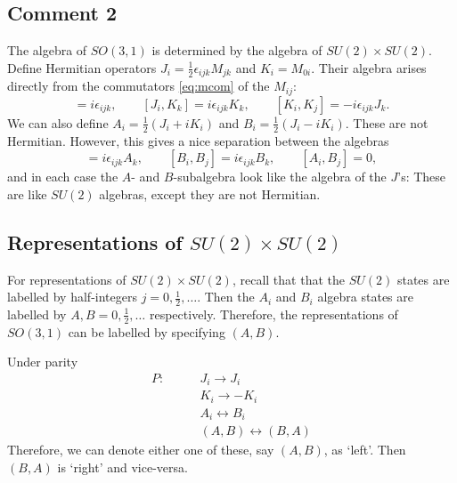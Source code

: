 
\subsection*{Comment 2}%


The algebra of $SO(3, 1)$ is determined by the algebra of $SU(2) \times SU(2)$.
Define Hermitian operators $J_{i} = \frac{1}{2} \epsilon_{ijk} M_{jk}$ and $K_{i} = M_{0i}$. Their algebra arises directly from the commutators \eqref{eq:mcom} of the $M_{ij}$:
\begin{equation}
  [J_{i}, J_{j}] = i \epsilon_{ijk}, 
  \qquad [J_{i}, K_k] = i \epsilon_{ijk} K_k,
  \qquad [K_{i}, K_{j}] = -i \epsilon_{ijk} J_k.
\end{equation}
We can also define $A_i = \frac{1}{2} (J_i + i K_i)$ and $B_i = \frac{1}{2} (J_i - i K_i)$. These are not Hermitian.
However, this gives a nice separation between the algebras
\begin{equation}
  [A_i, A_j] = i \epsilon_{ijk} A_k, \qquad
  [B_i, B_j] = i \epsilon_{ijk} B_k, \qquad
  [A_i, B_j] = 0,
\end{equation}
and in each case the $A$- and $B$-subalgebra look like the algebra of the $J$'s: These are like $SU(2)$ algebras, except they are not Hermitian.


\subsection*{Representations of $SU(2) \times SU(2)$}%

For representations of $SU(2) \times SU(2)$, recall that that the $SU(2)$ states are labelled by half-integers $j = 0, \frac{1}{2}, \dots$.
Then the $A_i$ and $B_i$ algebra states are labelled by $A, B = 0, \frac{1}{2}, \dots$ respectively.
Therefore, the representations of $SO(3, 1)$ can be labelled by specifying $(A, B)$.
\begin{remark}
  Under parity
  \begin{align}
    P\colon \qquad &J_i \to J_i \\
		   & K_i \to -K_i \\
		   & A_i \leftrightarrow B_i \\
		   & (A, B) \leftrightarrow (B, A)
  \end{align}
  Therefore, we can denote either one of these, say $(A, B)$, as `left'. Then $(B, A)$ is `right' and vice-versa.
\end{remark}

